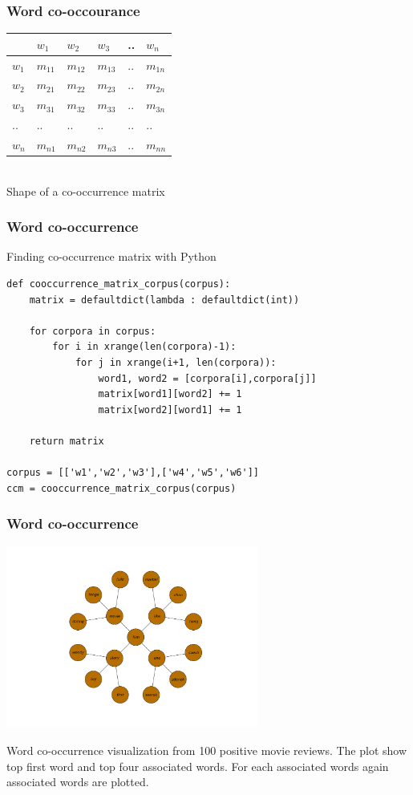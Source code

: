\documentclass[serif,11pt,aspectratio=1610,table]{beamer}
\begin{document}
\begin{frame}[fragile]
 \frametitle{Word co-occourance}

\begin{center}
 \begin{tabular}{|l|l|l|l|l|l|}
 \hline
  & $w_{1}$ & $w_{2}$ & $w_{3}$ & .. & $w_{n}$ \\ \hline
 $w_{1}$ & $m_{11}$ & $m_{12}$ & $m_{13}$ & ..  & $m_{1n}$ \\ \hline
 $w_{2}$ & $m_{21}$ & $m_{22}$ & $m_{23}$ & ..  & $m_{2n}$ \\ \hline
 $w_{3}$ & $m_{31}$ & $m_{32}$ & $m_{33}$ & ..  & $m_{3n}$ \\ \hline
 .. & .. & .. & .. & ..  & .. \\ \hline
 $w_{n}$ & $m_{n1}$ & $m_{n2}$ & $m_{n3}$ & ..  & $m_{nn}$ \\ \hline
\end{tabular}
\scriptsize
\\ Shape of a co-occurrence matrix
\end{center}

\scriptsize

\end{frame}

\begin{frame}[fragile]
 \frametitle{Word co-occurrence}
Finding co-occurrence matrix with Python
\footnotesize
\begin{verbatim}
def cooccurrence_matrix_corpus(corpus):
    matrix = defaultdict(lambda : defaultdict(int))

    for corpora in corpus:
        for i in xrange(len(corpora)-1):
            for j in xrange(i+1, len(corpora)):
                word1, word2 = [corpora[i],corpora[j]]
                matrix[word1][word2] += 1
                matrix[word2][word1] += 1

    return matrix

corpus = [['w1','w2','w3'],['w4','w5','w6']]
ccm = cooccurrence_matrix_corpus(corpus)
\end{verbatim}

\end{frame}


\begin{frame}[fragile]
\frametitle{Word co-occurrence}
\begin{center}
 \includegraphics[height=6cm]{mov_rev_100_pos.pdf} 
\end{center}
\scriptsize
Word co-occurrence visualization from 100 positive movie reviews. The plot show top first word and top four associated words. For each associated words again associated words are plotted. 
\end{frame}
\end{document}
